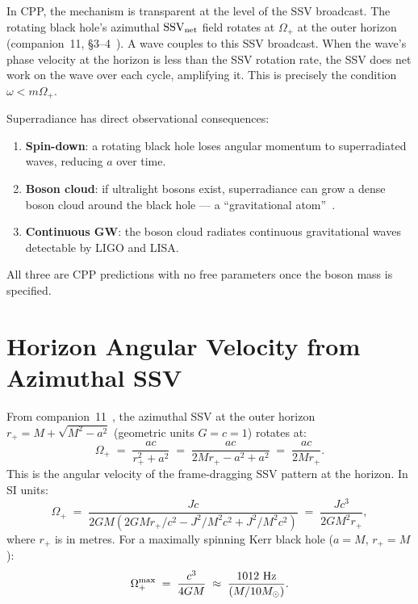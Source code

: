 \documentclass[12pt]{article}
\newcommand{\rplus}{r_+}
\newcommand{\Oplus}{\Omega_+}
\newcommand{\SSV}{\mathrm{SSV}}
\begin{document}
In CPP, the mechanism is transparent at the level of the SSV
broadcast.  The rotating black hole's azimuthal $\SSV_{\rm net}$
field rotates at $\Oplus$ at the outer horizon (companion~11,
§3--4~\cite{c11}).  A wave couples to this SSV broadcast.  When
the wave's phase velocity at the horizon is less than the SSV
rotation rate, the SSV does net work on the wave over each cycle,
amplifying it.  This is precisely the condition $\omega < m\Oplus$.

Superradiance has direct observational consequences:
\begin{enumerate}[noitemsep]
  \item \textbf{Spin-down}: a rotating black hole loses angular
    momentum to superradiated waves, reducing $a$ over time.
  \item \textbf{Boson cloud}: if ultralight bosons exist, superradiance
    can grow a dense boson cloud around the black hole — a
    ``gravitational atom''~\cite{detweiler1980}.
  \item \textbf{Continuous GW}: the boson cloud radiates continuous
    gravitational waves detectable by LIGO and LISA.
\end{enumerate}

All three are CPP predictions with no free parameters once the
boson mass is specified.

\section{Horizon Angular Velocity from Azimuthal SSV}
\label{sec:omega_plus}

From companion~11~\cite{c11}, the azimuthal SSV at the outer horizon
$\rplus = M + \sqrt{M^2-a^2}$ (geometric units $G=c=1$) rotates at:
\begin{equation}
  \Oplus \;=\; \frac{ac}{\rplus^2 + a^2}
  \;=\; \frac{ac}{2M\rplus - a^2 + a^2}
  \;=\; \frac{ac}{2M\rplus}.
  \label{eq:omega_plus}
\end{equation}
This is the angular velocity of the frame-dragging SSV pattern at the
horizon.  In SI units:
\begin{equation}
  \Oplus \;=\; \frac{Jc}{2GM(2GMr_+/c^2 - J^2/M^2c^2 + J^2/M^2c^2)}
  \;=\; \frac{Jc^3}{2GM^2 r_+},
  \label{eq:omega_plus_SI}
\end{equation}
where $r_+$ is in metres.  For a maximally spinning Kerr black hole
($a = M$, $\rplus = M$):
\begin{equation}
  \Oplus^{\rm max} \;=\; \frac{c^3}{4GM}
  \;\approx\; \frac{1012\ \mathrm{Hz}}{(M/10M_\odot)}.
  \label{eq:omega_max}
\end{equation}
\end{document}
